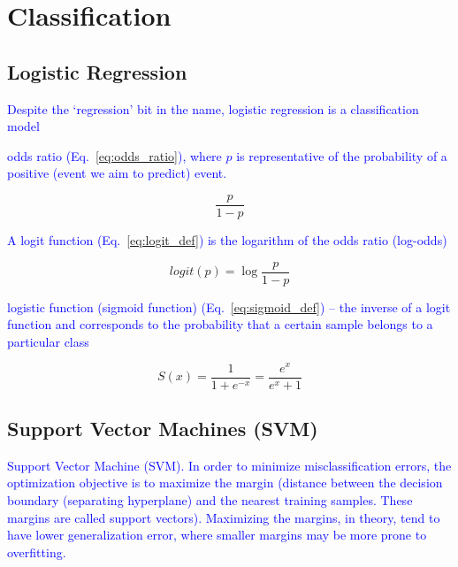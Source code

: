 \section{Classification}

\subsection{Logistic Regression}

\textcolor{blue}{Despite the `regression' bit in the name, logistic regression is a classification model}

\textcolor{blue}{odds ratio (Eq.~\ref{eq:odds_ratio}), where $p$ is representative of the probability of a positive (event we aim to predict) event.}

\begin{equation}
{\frac{p}{1-p}}
\label{eq:odds_ratio}
\end{equation}

\textcolor{blue}{A logit function (Eq.~\ref{eq:logit_def}) is the logarithm of the odds ratio (log-odds)}

\begin{equation}
{logit(p)=\log{\frac{p}{1-p}}}
\label{eq:logit_def}
\end{equation}

\textcolor{blue}{logistic function (sigmoid function) (Eq.~\ref{eq:sigmoid_def}) -- the inverse of a logit function and corresponds to the probability that a certain sample belongs to a particular class}

\begin{equation}
{S(x)={\frac{1}{1+e^{-x}}}={\frac{e^x}{e^x+1}}}
\label{eq:sigmoid_def}
\end{equation}


\subsection{Support Vector Machines (SVM)}

\textcolor{blue}{Support Vector Machine (SVM). In order to minimize misclassification errors, the optimization objective is to maximize the margin (distance between the decision boundary (separating hyperplane) and the nearest training samples. These margins are called support vectors). Maximizing the margins, in theory, tend to have lower generalization error, where smaller margins may be more prone to overfitting.}

